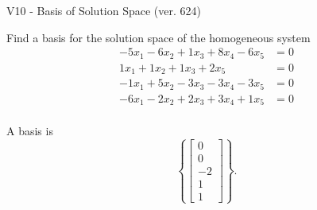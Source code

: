 \begin{exercise}
  \begin{exerciseTitle}V10 - Basis of Solution Space (ver. 624)\end{exerciseTitle}
  \begin{exerciseStatement}
    Find a basis for the solution space of the homogeneous system 
\begin{align*}
 -5 x_ 1 -6 x_ 2 + 1 x_ 3 + 8 x_ 4 -6 x_ 5 &= 0  \\ 
  1 x_ 1 + 1 x_ 2 + 1 x_ 3 + 2 x_ 5 &= 0  \\ 
  -1 x_ 1 + 5 x_ 2 -3 x_ 3 -3 x_ 4 -3 x_ 5 &= 0  \\ 
  -6 x_ 1 -2 x_ 2 + 2 x_ 3 + 3 x_ 4 + 1 x_ 5 &= 0  \\ 
 \end{align*}


 
  \end{exerciseStatement}

  \begin{exerciseAnswer}
   A basis is   
\[\left\{\left[\begin{array}{c}
0 \\
0 \\
-2 \\
1 \\
1
\end{array}\right]\right\}.\]

  


  \end{exerciseAnswer}
\end{exercise}